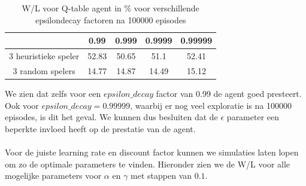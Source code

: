 \documentclass[11pt]{article}
\begin{document}
\begin{table}[H]
        \centering
        \begin{tabular}{|c|c|c|c|c|}
                \hline
                                & 0.99&0.999&0.9999&0.99999\\
                                \hline
                3 heuristieke speler  &52.83&50.65&51.1&52.41\\
                3 random spelers      &14.77&14.87&14.49&15.12\\
                \hline
        \end{tabular}
        \caption{W/L voor Q-table agent in \% voor verschillende epsilondecay factoren na 100000 episodes}
\end{table}
We zien dat zelfs voor een $epsilon\_decay$ factor van 0.99 de agent goed presteert. Ook voor $epsilon\_decay = 0.99999$, waarbij er nog veel exploratie is na 100000 episodes, is dit het geval. We kunnen dus besluiten dat de $\epsilon$ parameter een beperkte invloed heeft op de prestatie van de agent.\\\\
Voor de juiste learning rate en discount factor kunnen we simulaties laten lopen om zo de optimale parameters te vinden. Hieronder zien we de W/L voor alle mogelijke parameters voor $\alpha$ en $\gamma$ met stappen van $0.1$.
\end{document}
